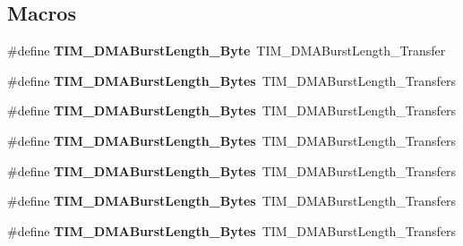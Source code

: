 \subsection*{Macros}
\begin{DoxyCompactItemize}
\item 
\mbox{\label{group___t_i_m___legacy_gad915c67fae262b887f4f074809448309}} 
\#define {\bfseries T\+I\+M\+\_\+\+D\+M\+A\+Burst\+Length\+\_\+Byte}~T\+I\+M\+\_\+\+D\+M\+A\+Burst\+Length\+\_\+Transfer
\item 
\mbox{\label{group___t_i_m___legacy_gabed2d89b663148923f4a7ca63d62d947}} 
\#define {\bfseries T\+I\+M\+\_\+\+D\+M\+A\+Burst\+Length\+\_\+Bytes}~T\+I\+M\+\_\+\+D\+M\+A\+Burst\+Length\+\_\+Transfers
\item 
\mbox{\label{group___t_i_m___legacy_gad06dbc68a994da99b017a18a7197c0ad}} 
\#define {\bfseries T\+I\+M\+\_\+\+D\+M\+A\+Burst\+Length\+\_\+Bytes}~T\+I\+M\+\_\+\+D\+M\+A\+Burst\+Length\+\_\+Transfers
\item 
\mbox{\label{group___t_i_m___legacy_ga620ce560a1d7a6d6769cacd2a2ead48d}} 
\#define {\bfseries T\+I\+M\+\_\+\+D\+M\+A\+Burst\+Length\+\_\+Bytes}~T\+I\+M\+\_\+\+D\+M\+A\+Burst\+Length\+\_\+Transfers
\item 
\mbox{\label{group___t_i_m___legacy_gaf9ac4a4cfd3dcfb7ba859898e702c881}} 
\#define {\bfseries T\+I\+M\+\_\+\+D\+M\+A\+Burst\+Length\+\_\+Bytes}~T\+I\+M\+\_\+\+D\+M\+A\+Burst\+Length\+\_\+Transfers
\item 
\mbox{\label{group___t_i_m___legacy_ga7a9cc659b4fc010a31815254f6b57e3f}} 
\#define {\bfseries T\+I\+M\+\_\+\+D\+M\+A\+Burst\+Length\+\_\+Bytes}~T\+I\+M\+\_\+\+D\+M\+A\+Burst\+Length\+\_\+Transfers
\item 
\mbox{\label{group___t_i_m___legacy_ga5833cc5442c40a97a6a90bcd34a2e773}} 
\#define {\bfseries T\+I\+M\+\_\+\+D\+M\+A\+Burst\+Length\+\_\+Bytes}~T\+I\+M\+\_\+\+D\+M\+A\+Burst\+Length\+\_\+Transfers
\item 
\mbox{\label{group___t_i_m___legacy_gab7c002a9f06f7c238e15a0c61f047062}} 

\end{DoxyCompactItemize}
